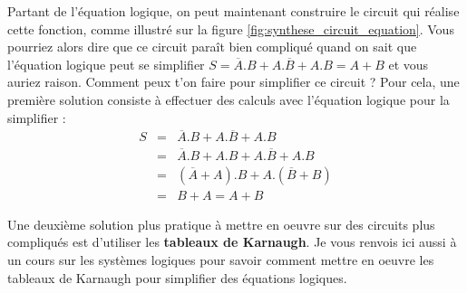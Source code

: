 Partant de l'équation logique, on peut maintenant construire le circuit qui réalise cette fonction, comme illustré sur la figure \ref{fig:synthese_circuit_equation}. Vous pourriez alors dire que ce circuit paraît bien compliqué quand on sait que l'équation logique peut se simplifier $S= \overline{A}. B + A . \overline{B} + A.B = A + B$ et vous auriez raison. Comment peux t'on faire pour simplifier ce circuit ? Pour cela, une première solution consiste à effectuer des calculs avec l'équation logique pour la simplifier :
\begin{eqnarray*}
S &=& \overline{A}. B + A . \overline{B} + A.B\\
  &=& \overline{A}. B + A.B + A . \overline{B} + A.B\\
  &=& (\overline{A} + A). B + A.(\overline{B} + B)\\
  &=& B + A = A + B
\end{eqnarray*}

Une deuxième solution plus pratique à mettre en oeuvre sur des circuits plus compliqués est d'utiliser les \textbf{tableaux de Karnaugh}. Je vous renvois ici aussi à un cours sur les systèmes logiques pour savoir comment mettre en oeuvre les tableaux de Karnaugh pour simplifier des équations logiques.

